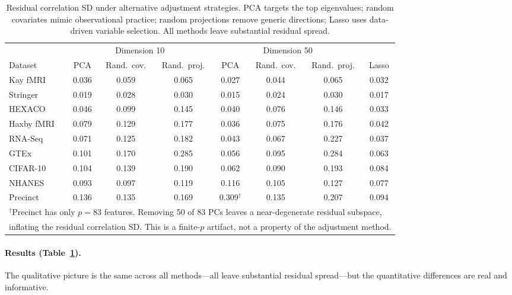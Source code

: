 \begin{table}[h]
\centering
\caption{Residual correlation SD under alternative adjustment strategies.
PCA targets the top eigenvalues; random covariates mimic observational
practice; random projections remove generic directions; Lasso uses data-driven
variable selection. All methods leave substantial residual spread.}
\label{tab:alt-adjust}
\small
\begin{tabular}{l ccc ccc c}
\toprule
& \multicolumn{3}{c}{Dimension 10} & \multicolumn{3}{c}{Dimension 50} & \\
\cmidrule(lr){2-4} \cmidrule(lr){5-7}
Dataset & PCA & Rand.\ cov. & Rand.\ proj. & PCA & Rand.\ cov. & Rand.\ proj. & Lasso \\
\midrule
Kay fMRI    & 0.036 & 0.059 & 0.065 & 0.027 & 0.044 & 0.065 & 0.032 \\
Stringer    & 0.019 & 0.028 & 0.030 & 0.015 & 0.024 & 0.030 & 0.017 \\
HEXACO      & 0.046 & 0.099 & 0.145 & 0.040 & 0.076 & 0.146 & 0.033 \\
Haxby fMRI  & 0.079 & 0.129 & 0.177 & 0.036 & 0.075 & 0.176 & 0.042 \\
RNA-Seq     & 0.071 & 0.125 & 0.182 & 0.043 & 0.067 & 0.227 & 0.037 \\
GTEx        & 0.101 & 0.170 & 0.285 & 0.056 & 0.095 & 0.284 & 0.063 \\
CIFAR-10    & 0.104 & 0.139 & 0.190 & 0.062 & 0.090 & 0.193 & 0.084 \\
NHANES      & 0.093 & 0.097 & 0.119 & 0.116 & 0.105 & 0.127 & 0.077 \\
Precinct    & 0.136 & 0.135 & 0.169 & 0.309$^\dagger$ & 0.135 & 0.207 & 0.094 \\
\bottomrule
\multicolumn{8}{l}{\footnotesize $^\dagger$Precinct has only $p{=}83$ features.
Removing 50 of 83 PCs leaves a near-degenerate residual subspace,}\\
\multicolumn{8}{l}{\footnotesize inflating the residual correlation SD.
This is a finite-$p$ artifact, not a property of the adjustment method.}
\end{tabular}
\end{table}

\paragraph{Results (Table~\ref{tab:alt-adjust}).}
The qualitative picture is the same across all methods---all leave substantial
residual spread---but the quantitative differences are real and informative.

